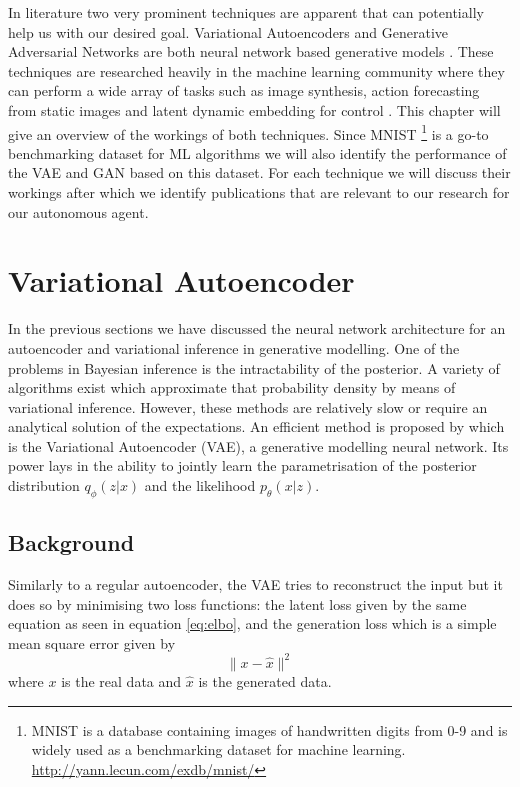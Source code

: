 \documentclass[main.tex]{subfiles}
\begin{document}
In literature two very prominent techniques are apparent that can potentially help us with our desired goal. Variational Autoencoders and Generative Adversarial Networks are both neural network based generative models \cite{kingma2013auto,goodfellow2014generative}. These techniques are researched heavily in the machine learning community where they can perform a wide array of tasks such as image synthesis, action forecasting from static images \cite{walker2016uncertain} and latent dynamic embedding for control \cite{watter2015embed}. This chapter will give an overview of the workings of both techniques. Since MNIST \footnote{MNIST is a database containing images of handwritten digits from 0-9 and is widely used as a benchmarking dataset for machine learning. \url{http://yann.lecun.com/exdb/mnist/}} is a go-to benchmarking dataset for ML algorithms we will also identify the performance of the VAE and GAN based on this dataset. For each technique we will discuss their workings after which we identify publications that are relevant to our research for our autonomous agent.
 
\section{Variational Autoencoder}
In the previous sections we have discussed the neural network architecture for an autoencoder and variational inference in generative modelling. One of the problems in Bayesian inference is the intractability of the posterior. A variety of algorithms exist which approximate that probability density by means of variational inference. However, these methods are relatively slow or require an analytical solution of the expectations. An efficient method is proposed by \cite{kingma2013auto} which is the Variational Autoencoder (VAE), a generative modelling neural network. Its power lays in the ability to jointly learn the parametrisation of the posterior distribution $q_\phi(z|x)$ and the likelihood $p_\theta(x|z)$.

\subsection{Background}
Similarly to a regular autoencoder, the VAE tries to reconstruct the input but it does so by minimising two loss functions: the latent loss given by the same equation as seen in equation \eqref{eq:elbo}, and the generation loss which is a simple mean square error given by
\begin{equation}
  \lVert x-\hat{x} \rVert^2
\end{equation}
where $x$ is the real data and $\hat{x}$ is the generated data. 
\end{document}
